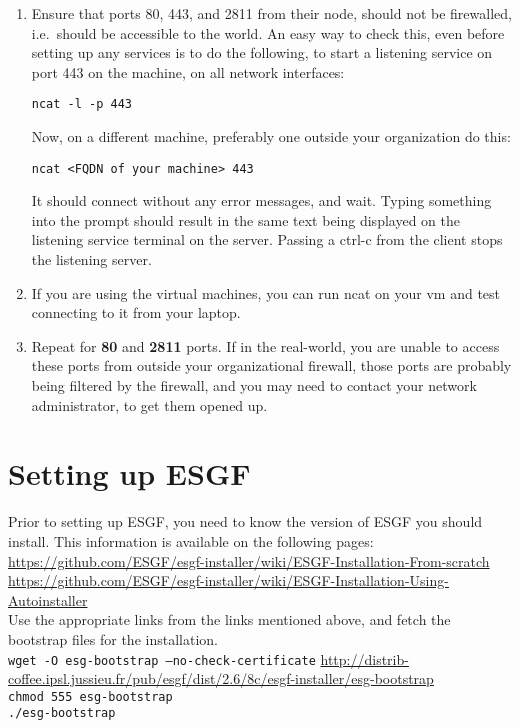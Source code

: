 \begin{enumerate}
\tightlist
\item
  Ensure that ports 80, 443, and 2811 from their node, should not be
  firewalled, i.e.~should be accessible to the world. An easy way to
  check this, even before setting up any services is to do the following, to start a listening service on port 443 on the machine, on all network interfaces:
\begin{verbatim}
ncat -l -p 443
\end{verbatim}
Now, on a different machine, preferably one outside your organization do this:
\begin{verbatim}
ncat <FQDN of your machine> 443
\end{verbatim}
It should connect without any error messages, and wait. Typing something into the prompt should
  result in the same text being displayed on the listening service
  terminal on the server. Passing a ctrl-c from the client stops the
  listening server. 
\item If you are using the virtual machines, you can run ncat on your vm and test connecting to it from your laptop.
\item Repeat for \textbf{80} and \textbf{2811} ports. If in the real-world, you are unable to access these ports from outside your organizational firewall, those ports are probably being filtered by the firewall, and you may need to contact your network administrator, to get them opened up. 
\end{enumerate}

\section{Setting up ESGF}

Prior to setting up ESGF, you need to know the version of ESGF you should install. This information is available on the following pages:\\
\url{https://github.com/ESGF/esgf-installer/wiki/ESGF-Installation-From-scratch}\\
\url{https://github.com/ESGF/esgf-installer/wiki/ESGF-Installation-Using-Autoinstaller}\\

Use the appropriate links from the links mentioned above, and fetch the bootstrap files for the installation.\\
\texttt{wget -O esg-bootstrap --no-check-certificate} \url{http://distrib-coffee.ipsl.jussieu.fr/pub/esgf/dist/2.6/8c/esgf-installer/esg-bootstrap}\\
\texttt{chmod 555 esg-bootstrap}\\
\texttt{./esg-bootstrap}

